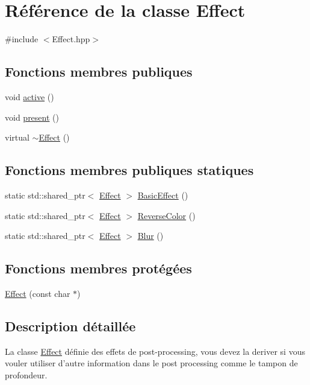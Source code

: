 \hypertarget{classEffect}{\section{Référence de la classe Effect}
\label{classEffect}
}


{\ttfamily \#include $<$Effect.\+hpp$>$}

\subsection*{Fonctions membres publiques}
\begin{DoxyCompactItemize}
\item 
void \hyperlink{classEffect_a8e68a9e3425e66eb6bbbd3add290ca6c}{active} ()
\item 
void \hyperlink{classEffect_a22176fa1e839457301c980d6a5f26ce6}{present} ()
\item 
virtual \hyperlink{classEffect_ac26c0a394247e14c9081f875522b5b66}{$\sim$\+Effect} ()
\end{DoxyCompactItemize}
\subsection*{Fonctions membres publiques statiques}
\begin{DoxyCompactItemize}
\item 
static std\+::shared\+\_\+ptr$<$ \hyperlink{classEffect}{Effect} $>$ \hyperlink{classEffect_a391bd9d2caa4bfbf30958217168da879}{Basic\+Effect} ()
\item 
static std\+::shared\+\_\+ptr$<$ \hyperlink{classEffect}{Effect} $>$ \hyperlink{classEffect_a940b42600d3b066e307fbdd6536a6e1b}{Reverse\+Color} ()
\item 
static std\+::shared\+\_\+ptr$<$ \hyperlink{classEffect}{Effect} $>$ \hyperlink{classEffect_a053c70ee3344e4685bdc9742088b0e44}{Blur} ()
\end{DoxyCompactItemize}
\subsection*{Fonctions membres protégées}
\begin{DoxyCompactItemize}
\item 
\hyperlink{classEffect_a14a84b6d0c7174387b56cba0fab82730}{Effect} (const char $\ast$)
\end{DoxyCompactItemize}


\subsection{Description détaillée}
La classe \hyperlink{classEffect}{Effect} définie des effets de post-\/processing, vous devez la deriver si vous vouler utiliser d'autre information dans le post processing comme le tampon de profondeur. 

